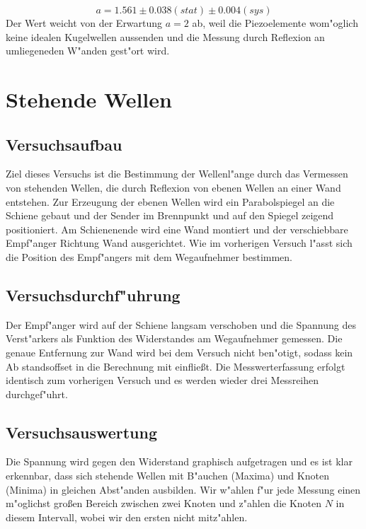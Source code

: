 \documentclass[12pt,a4paper]{article}
\begin{document}
\begin{equation}
a=1.561\pm0.038(stat)\pm0.004(sys)
\end{equation}
Der Wert weicht von der Erwartung $a=2$ ab, weil die Piezoelemente wom"oglich keine idealen Kugelwellen aussenden und die Messung durch Reflexion an umliegeneden W"anden gest"ort wird.


\section{Stehende Wellen}

\subsection{Versuchsaufbau}
Ziel dieses Versuchs ist die Bestimmung der Wellenl"ange durch das Vermessen von stehenden Wellen, die durch Reflexion von ebenen Wellen an einer Wand entstehen.
Zur Erzeugung der ebenen Wellen wird ein Parabolspiegel an die Schiene gebaut und der Sender im Brennpunkt und auf den Spiegel zeigend positioniert. Am Schienenende wird eine Wand montiert und der verschiebbare Empf"anger Richtung Wand ausgerichtet. Wie im vorherigen Versuch l"asst sich die Position des Empf"angers mit dem Wegaufnehmer bestimmen.

\subsection{Versuchsdurchf"uhrung}
Der Empf"anger wird auf der Schiene langsam verschoben und die Spannung des Verst"arkers als Funktion des Widerstandes am Wegaufnehmer gemessen. Die genaue Entfernung zur Wand wird bei dem Versuch nicht ben"otigt, sodass kein Ab
standsoffset in die Berechnung mit einflie\ss t.
Die Messwerterfassung erfolgt identisch zum vorherigen Versuch und es werden wieder drei Messreihen durchgef"uhrt.

\subsection{Versuchsauswertung}
Die Spannung wird gegen den Widerstand graphisch aufgetragen und es ist klar erkennbar, dass sich stehende Wellen mit B"auchen (Maxima) und Knoten (Minima) in gleichen Abst"anden ausbilden. Wir w"ahlen  f"ur jede Messung einen m"oglichst gro\ss en Bereich zwischen zwei Knoten und z"ahlen die Knoten $N$ in diesem Intervall, wobei wir den ersten nicht mitz"ahlen. 
\end{document}
